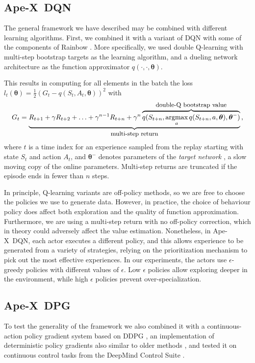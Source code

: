 \documentclass{article} \PassOptionsToPackage{usenames,dvipsnames}{xcolor}
\def\apex{Ape-X}
\def\th{{\bm \theta}}
\DeclareMathOperator*{\argmax}{\mbox{argmax}}
\begin{document}
\subsection{\apex\ DQN}

The general framework we have described may be combined with different learning algorithms. First, we combined it with a variant of DQN \citep{dqn} with some of the components of Rainbow \citep{rainbow}. More specifically, we used double Q-learning \citep{doubleq, deepdoubleqlearning} with multi-step bootstrap targets \citep[cf.][]{Sutton:1988, SuttonBarto:1998, SuttonBarto:2017, a3c} as the learning algorithm, and a dueling network architecture \citep{dueling} as the function approximator $q(\cdot, \cdot, \th)$.

This results in computing for all elements in the batch the loss $l_t(\th) = \frac{1}{2}(G_t - q(S_t, A_t, \th))^2$ with 
\[
G_t = \underbrace{R_{t+1} + \gamma R_{t+2} + \ldots + \gamma^{n-1} R_{t+n} + \gamma^n \overbrace{q(S_{t+n}, \argmax_a q(S_{t+n}, a, \th), \th^-)}^{\mbox{\small double-Q bootstrap value}}}_{\mbox{\small multi-step return}} \,,
\]
where $t$ is a time index for an experience sampled from the replay starting with state $S_t$ and action $A_t$, and $\th^-$ denotes parameters of the \emph{target network} \citep{dqn}, a slow moving copy of the online parameters. Multi-step returns are truncated if the episode ends in fewer than $n$ steps.

In principle, Q-learning variants are off-policy methods, so we are free to choose the policies we use to generate data. However, in practice, the choice of behaviour policy does affect both exploration and the quality of function approximation. Furthermore, we are using a multi-step return with no off-policy correction, which in theory could adversely affect the value estimation. Nonetheless, in \apex\ DQN, each actor executes a different policy, and this allows experience to be generated from a variety of strategies, relying on the prioritization mechanism to pick out the most effective experiences. In our experiments, the actors use $\epsilon$-greedy policies with different values of $\epsilon$. Low $\epsilon$ policies allow exploring deeper in the environment, while high $\epsilon$ policies prevent over-specialization.

\subsection{\apex\ DPG}

To test the generality of the framework we also combined it with a continuous-action policy gradient system based on DDPG \citep{ddpg}, an implementation of deterministic policy gradients \cite{dpg} also similar to older methods \citep{adhdp,acd}, and tested it on continuous control tasks from the DeepMind Control Suite \citep{tassa2018suite}.
\end{document}
